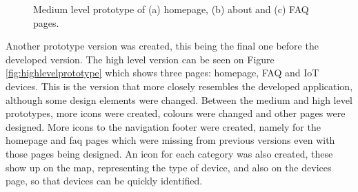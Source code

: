 \begin{figure}
\begin{subfigure}{0.33\textwidth}
        \caption{}
        \label{fig:mediumfaq}
    \end{subfigure}%
    \caption{Medium level prototype of (a) homepage, (b) about and (c) FAQ pages.}
    \label{fig:mediumlevelprototype}
\end{figure}

Another prototype version was created, this being the final one before
the developed version. The high level version can be seen on Figure \ref{fig:highlevelprototype}
which shows three pages: homepage, FAQ and IoT devices. This is the version
that more closely resembles the developed application, although some design
elements were changed. Between the medium and high level prototypes, more icons
were created, colours were changed and other pages were designed. More icons
to the navigation footer were created, namely for the homepage and faq pages
which were missing from previous versions even with those pages being designed.
An icon for each category was also created, these show up on the map, representing
the type of device, and also on the devices page, so that devices can be quickly
identified.

